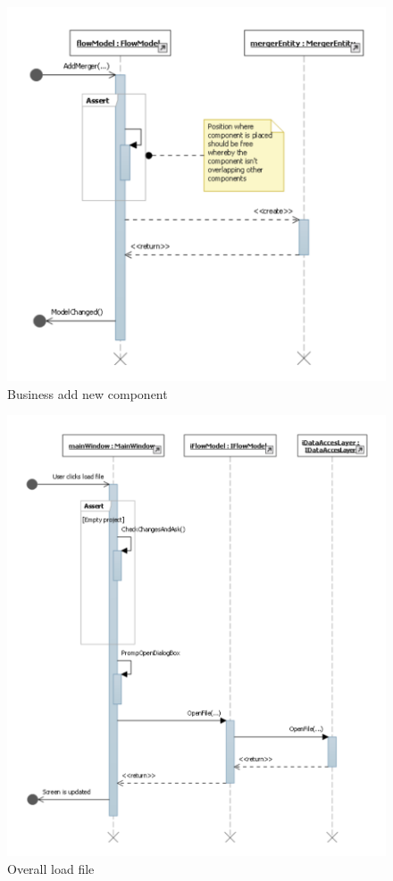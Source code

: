 \begin{figure}[h!]
	\centering
	\includegraphics{figures/BusinessAddNewComponent.pdf}
	\caption{Business add new component}
	\label{fig:seqbus}
\end{figure}

\begin{figure}[h!]
	\centering
	\includegraphics[width=\textwidth]{figures/OverallLoadFile.pdf}
	\caption{Overall load file}
	\label{fig:seqoverall}
\end{figure}

